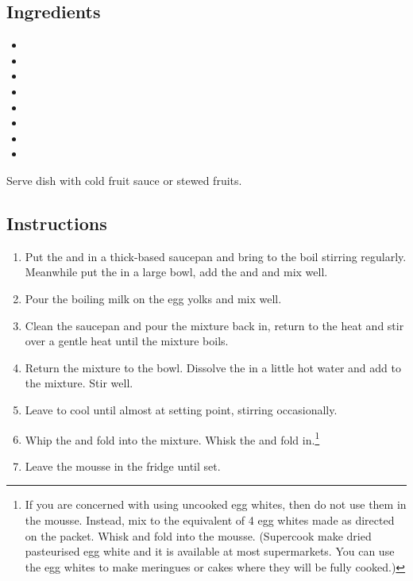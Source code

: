 \documentclass[12pt]{article}
\begin{document}
\recipetitle

\subsection*{Ingredients}

\begin{itemize}[nolistsep]
    \item {}
    \item {}
    \item {}
    \item {}
    \item {}
    \item {}
    \item {}
    \item {}
\end{itemize}

Serve dish with cold fruit sauce or stewed fruits.

\subsection*{Instructions}

\begin{enumerate}
    \item Put the  and  in a thick-based saucepan and bring to the boil stirring regularly. Meanwhile put the  in a large bowl, add the  and  and mix well.
    \item Pour the boiling milk on the egg yolks and mix well.
    \item Clean the saucepan and pour the mixture back in, return to the heat and stir over a gentle heat until the mixture boils.
    \item Return the mixture to the bowl. Dissolve the  in a little hot water and add to the mixture. Stir well.
    \item Leave to cool until almost at setting point, stirring occasionally.
    \item Whip the  and fold into the mixture. Whisk the  and fold in.\footnote{If you are concerned with using uncooked egg whites, then do not use them in the mousse. Instead, mix  to the equivalent of 4 egg whites made as directed on the packet. Whisk and fold into the mousse. (Supercook make dried pasteurised egg white and it is available at most supermarkets. You can use the egg whites to make meringues or cakes where they will be fully cooked.)}
    \item Leave the mousse in the fridge until set.
\end{enumerate}
\end{document}
